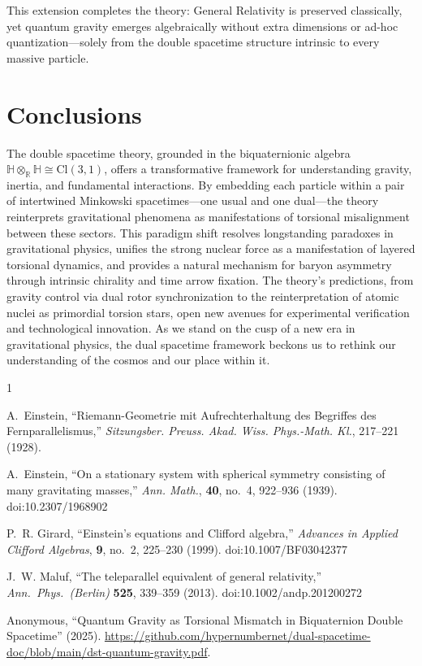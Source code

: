 \documentclass[dvipdfmx,a4paper]{article}
\begin{document}
This extension completes the theory: General Relativity is preserved classically, yet quantum gravity emerges algebraically without extra dimensions or ad-hoc quantization—solely from the double spacetime structure intrinsic to every massive particle.

\section{Conclusions}
\label{sec:conclusions}
The double spacetime theory, grounded in the biquaternionic algebra $\mathbb{H} \otimes_{\mathbb{R}} \mathbb{H} \cong \mathrm{Cl}(3,1)$, offers a transformative framework for understanding gravity, inertia, and fundamental interactions. By embedding each particle within a pair of intertwined Minkowski spacetimes—one usual and one dual—the theory reinterprets gravitational phenomena as manifestations of torsional misalignment between these sectors. This paradigm shift resolves longstanding paradoxes in gravitational physics, unifies the strong nuclear force as a manifestation of layered torsional dynamics, and provides a natural mechanism for baryon asymmetry through intrinsic chirality and time arrow fixation. The theory's predictions, from gravity control via dual rotor synchronization to the reinterpretation of atomic nuclei as primordial torsion stars, open new avenues for experimental verification and technological innovation. As we stand on the cusp of a new era in gravitational physics, the dual spacetime framework beckons us to rethink our understanding of the cosmos and our place within it.


\begin{thebibliography}{1}
\raggedright

A.~Einstein,
``Riemann-Geometrie mit Aufrechterhaltung des Begriffes des Fernparallelismus,''
\textit{Sitzungsber. Preuss. Akad. Wiss. Phys.-Math. Kl.},
217--221 (1928).

A.~Einstein,
``On a stationary system with spherical symmetry consisting of many gravitating masses,''
\textit{Ann. Math.},
\textbf{40}, no.~4, 922--936 (1939).
doi:10.2307/1968902

P.~R. Girard,
``Einstein’s equations and Clifford algebra,''
\textit{Advances in Applied Clifford Algebras},
\textbf{9}, no.~2, 225--230 (1999).
doi:10.1007/BF03042377

J.~W. Maluf,
``The teleparallel equivalent of general relativity,''
\textit{Ann.\ Phys.\ (Berlin)} \textbf{525}, 339--359 (2013).
doi:10.1002/andp.201200272

Anonymous,
``Quantum Gravity as Torsional Mismatch in Biquaternion Double Spacetime'' (2025).
\url{https://github.com/hypernumbernet/dual-spacetime-doc/blob/main/dst-quantum-gravity.pdf}.

\end{thebibliography}
\end{document}
